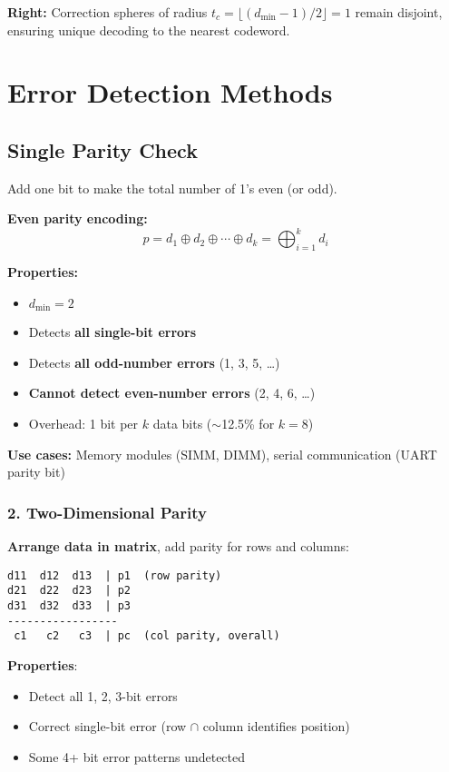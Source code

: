 \textbf{Right:} Correction spheres of radius $t_c = \lfloor(d_{\min} - 1)/2\rfloor = 1$ remain disjoint, ensuring unique decoding to the nearest codeword.

\section{Error Detection Methods}\label{error-detection-methods}

\subsection{Single Parity Check}

Add one bit to make the total number of 1's even (or odd).

\textbf{Even parity encoding:}
\begin{equation}
p = d_1 \oplus d_2 \oplus \cdots \oplus d_k = \bigoplus_{i=1}^{k} d_i
\label{eq:single-parity}
\end{equation}

\textbf{Properties:}
\begin{itemize}
\item $d_{\min} = 2$
\item Detects \textbf{all single-bit errors}
\item Detects \textbf{all odd-number errors} (1, 3, 5, \ldots)
\item \textbf{Cannot detect even-number errors} (2, 4, 6, \ldots)
\item Overhead: 1 bit per $k$ data bits ($\sim$12.5\% for $k=8$)
\end{itemize}

\textbf{Use cases:} Memory modules (SIMM, DIMM), serial communication (UART parity bit)

\subsubsection{2. Two-Dimensional Parity}\label{two-dimensional-parity}

\textbf{Arrange data in matrix}, add parity for rows and columns:

\begin{verbatim}
d11  d12  d13  | p1  (row parity)
d21  d22  d23  | p2
d31  d32  d33  | p3
-----------------
 c1   c2   c3  | pc  (col parity, overall)
\end{verbatim}

\textbf{Properties}:
\begin{itemize}
\item Detect all 1, 2, 3-bit errors
\item Correct single-bit error (row $\cap$ column identifies position)
\item Some 4+ bit error patterns undetected
\end{itemize}

